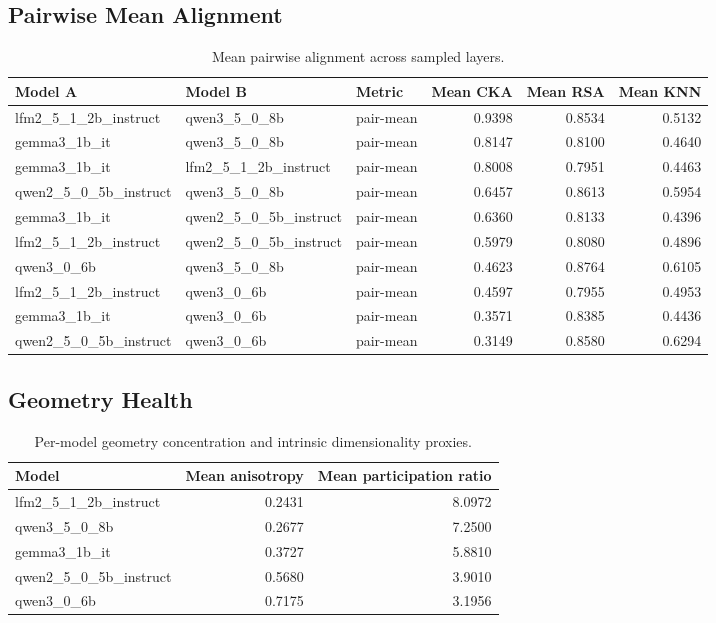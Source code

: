 ﻿\documentclass[11pt]{article}
\begin{document}
\subsection{Pairwise Mean Alignment}
\begin{table}[h]
\centering
\begin{tabular}{lllrrr}
\toprule
Model A & Model B & Metric & Mean CKA & Mean RSA & Mean KNN \\
\midrule
lfm2\_5\_1\_2b\_instruct & qwen3\_5\_0\_8b & pair-mean & 0.9398 & 0.8534 & 0.5132 \\
gemma3\_1b\_it & qwen3\_5\_0\_8b & pair-mean & 0.8147 & 0.8100 & 0.4640 \\
gemma3\_1b\_it & lfm2\_5\_1\_2b\_instruct & pair-mean & 0.8008 & 0.7951 & 0.4463 \\
qwen2\_5\_0\_5b\_instruct & qwen3\_5\_0\_8b & pair-mean & 0.6457 & 0.8613 & 0.5954 \\
gemma3\_1b\_it & qwen2\_5\_0\_5b\_instruct & pair-mean & 0.6360 & 0.8133 & 0.4396 \\
lfm2\_5\_1\_2b\_instruct & qwen2\_5\_0\_5b\_instruct & pair-mean & 0.5979 & 0.8080 & 0.4896 \\
qwen3\_0\_6b & qwen3\_5\_0\_8b & pair-mean & 0.4623 & 0.8764 & 0.6105 \\
lfm2\_5\_1\_2b\_instruct & qwen3\_0\_6b & pair-mean & 0.4597 & 0.7955 & 0.4953 \\
gemma3\_1b\_it & qwen3\_0\_6b & pair-mean & 0.3571 & 0.8385 & 0.4436 \\
qwen2\_5\_0\_5b\_instruct & qwen3\_0\_6b & pair-mean & 0.3149 & 0.8580 & 0.6294 \\
\bottomrule
\end{tabular}
\caption{Mean pairwise alignment across sampled layers.}
\end{table}

\subsection{Geometry Health}
\begin{table}[h]
\centering
\begin{tabular}{lrr}
\toprule
Model & Mean anisotropy & Mean participation ratio \\
\midrule
lfm2\_5\_1\_2b\_instruct & 0.2431 & 8.0972 \\
qwen3\_5\_0\_8b & 0.2677 & 7.2500 \\
gemma3\_1b\_it & 0.3727 & 5.8810 \\
qwen2\_5\_0\_5b\_instruct & 0.5680 & 3.9010 \\
qwen3\_0\_6b & 0.7175 & 3.1956 \\
\bottomrule
\end{tabular}
\caption{Per-model geometry concentration and intrinsic dimensionality proxies.}
\end{table}
\end{document}
